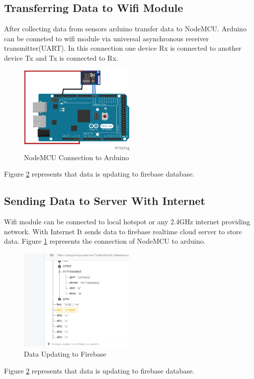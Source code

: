 \subsection{Transferring Data to Wifi Module}
After collecting data from sensors arduino transfer data to NodeMCU. Arduino can be conneted to wifi module via universal asynchronous receiver transmitter(UART). In this connection one device Rx is connected to another device Tx and Tx is connected to Rx.
\begin{figure}[H]
\centering
\includegraphics[width=0.5\textwidth]{figures/wifi_bb.png}
\caption{NodeMCU Connection to Arduino}
\label{node1}
\end{figure}
Figure \ref{node2} represents that data is updating to firebase database.

\subsection{Sending Data to Server With Internet}
Wifi module can be connected to local hotspot or any 2.4GHz internet providing network. With Internet It sends data to firebase realtime cloud server to store data. Figure \ref{node1} represents the connection of NodeMCU to arduino.
\begin{figure}[H]
\centering
\includegraphics[width=0.5\textwidth]{figures/slot_updating.png}
\caption{Data Updating to Firebase}
\label{node2}
\end{figure}
Figure \ref{node2} represents that data is updating to firebase database.

